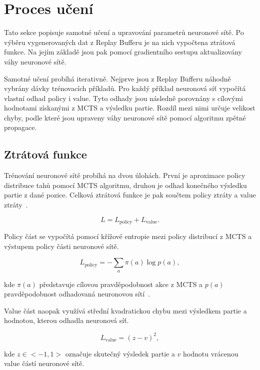 \section{Proces učení}

Tato sekce popisuje samotné učení a upravování parametrů neuronové sítě. Po výběru vygenerovaných dat z Replay Bufferu je na nich
vypočtena ztrátová funkce. Na jejím základě jsou pak pomocí gradientního sestupu aktualizovány váhy neuronové sítě.

Samotné učení probíhá iterativně. Nejprve jsou z Replay Bufferu náhodně vybrány dávky trénovacích příkladů. Pro každý příklad neuronová 
síť vypočítá vlastní odhad policy i value. Tyto odhady jsou následně porovnány s cílovými hodnotami získanými z MCTS a výsledku partie. 
Rozdíl mezi nimi určuje velikost chyby, podle které jsou upraveny váhy neuronové sítě pomocí algoritmu zpětné propagace.

\subsection{Ztrátová funkce}

Trénování neuronové sítě probíhá na dvou úlohách. První je aproximace policy distribuce tahů pomocí MCTS algoritmu, druhou je odhad konečného výsledku
partie z dané pozice. Celková ztrátová funkce je pak součtem policy ztráty a value ztráty~\cite{silver2017alphazero}.

\begin{equation}
L = L_{\mathrm{policy}} + L_{\mathrm{value}}.
\end{equation}

Policy část se vypočítá pomocí křížové entropie mezi policy distribucí z MCTS a výstupem policy části neuronové sítě.

\begin{equation}
L_{\mathrm{policy}}
=
-\sum_{a}\pi(a)\log p(a),
\end{equation}

kde $\pi(a)$ představuje cílovou pravděpodobnost akce z MCTS a $p(a)$ pravděpodobnost odhadovaná neuronovou sítí~\cite{goodfellow2016deep}.

Value část naopak využívá střední kvadratickou chybu mezi výsledkem partie a hodnotou, kterou odhadla neuronová síť.

\begin{equation}
L_{\mathrm{value}}
=
(z-v)^2,
\end{equation}

kde $z\in<-1,1>$ označuje skutečný výsledek partie a $v$ hodnotu vrácenou value částí neuronové sítě.

